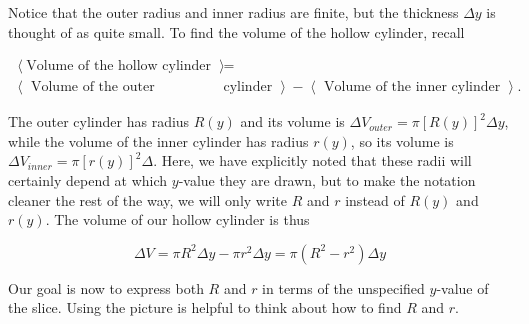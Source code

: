 \documentclass{ximera}
\begin{document}
\begin{model}
\begin{image}
            \end{image}

Notice that the outer radius and inner radius are finite, but the thickness $\Delta y$ is thought of as quite small.  To find the volume of the hollow cylinder, recall

\begin{align*}
\left< \textrm{Volume of the hollow cylinder } \right>  &=   \\
 \left< \textrm{ Volume of the outer} \right. & \left. \textrm{cylinder } \right> - \left< \textrm{ Volume of the inner cylinder } \right>.
\end{align*}
 
The outer cylinder has radius $R(y)$ and its volume is $\Delta V_{outer} = \pi [R(y)]^2 \Delta y$, while the volume of the inner cylinder has radius $r(y)$, so its volume is $\Delta V_{inner} = \pi [r(y)]^2 \Delta$.  Here, we have explicitly noted that these radii will certainly depend at which $y$-value they are drawn, but to make the notation cleaner the rest of the way, we will only write $R$ and $r$ instead of $R(y)$ and $r(y)$.  The volume of our hollow cylinder is thus
 
\[
\Delta V = \pi R^2 \Delta y -\pi r^2 \Delta y=\pi \left(R^2-r^2\right) \Delta y 
\]

Our goal is now to express both $R$ and $r$ in terms of the unspecified $y$-value of the slice.  Using the picture is helpful to think about how to find $R$ and $r$.


\end{model}
\end{document}
